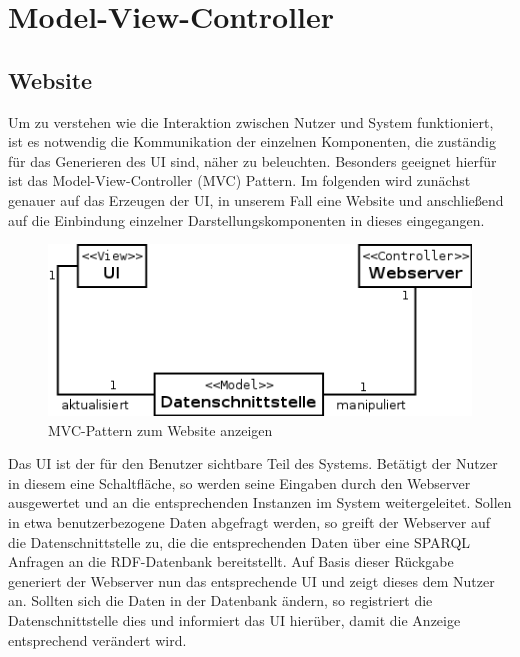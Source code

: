 \beginDocument
\section{Model-View-Controller}

\subsection*{Website}
\noindent Um zu verstehen wie die Interaktion zwischen Nutzer und System funktioniert, ist es notwendig die Kommunikation der einzelnen Komponenten, die zuständig für das Generieren des UI sind, näher zu beleuchten. 
Besonders geeignet hierfür ist das Model-View-Controller (MVC) Pattern. 
Im folgenden wird zunächst genauer auf das Erzeugen der UI, in unserem Fall eine Website und anschließend auf die Einbindung einzelner Darstellungskomponenten in dieses eingegangen. \\

\begin{figure}[h]
\centering
\includegraphics[scale=0.6]{../Grafik/Diagramm/Pattern/MVC/Website/Kontextdiagramm.png}
\caption[MVC Website Klassen]{MVC-Pattern zum Website anzeigen}
\end{figure}

\noindent  Das UI ist der für den Benutzer sichtbare Teil des Systems. Betätigt der Nutzer in diesem eine Schaltfläche, so werden seine Eingaben durch den Webserver ausgewertet und an die entsprechenden Instanzen im System weitergeleitet. Sollen in etwa benutzerbezogene Daten abgefragt werden, so greift der Webserver auf die Datenschnittstelle zu, die die entsprechenden Daten über eine SPARQL Anfragen an die RDF-Datenbank bereitstellt. Auf Basis dieser Rückgabe generiert der Webserver nun das entsprechende UI und  zeigt dieses dem Nutzer an.
Sollten sich die Daten in der Datenbank ändern, so registriert die Datenschnittstelle dies und informiert das UI hierüber, damit die Anzeige entsprechend verändert wird.


